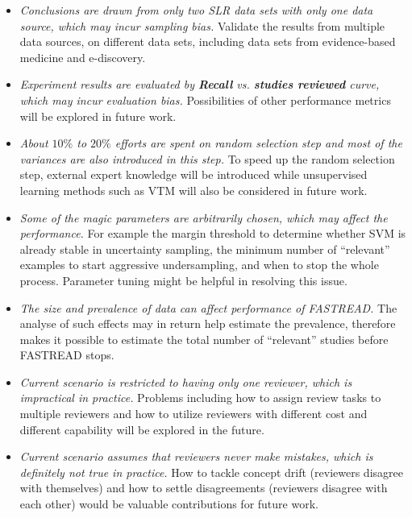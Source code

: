 \documentclass[final,twocolumn,5p]{elsarticle}
\theoremstyle{break}
\begin{document}
\begin{itemize}

\item
{\em Conclusions are drawn from only two SLR data sets with only one data source, which may incur sampling bias.} Validate the results from multiple data sources, on different data sets, including data sets from evidence-based medicine and e-discovery.

\item
{\em Experiment results are evaluated by \textbf{Recall} vs. \textbf{studies reviewed} curve, which may incur evaluation bias.} Possibilities of other performance metrics will be explored in future work.

\item
{\em About $10\%$ to $20\%$ efforts are spent on random selection step and most of the variances are also introduced in this step.} To speed up the random selection step, external expert knowledge will be introduced while unsupervised learning methods such as VTM will also be considered in future work. 

\item
{\em Some of the magic parameters are arbitrarily chosen, which may affect the performance.} For example the margin threshold to determine whether SVM is already stable in uncertainty sampling, the minimum number of ``relevant'' examples to start aggressive undersampling, and when to stop the whole process. Parameter tuning might be helpful in resolving this issue.

\item
{\em The size and prevalence of data can affect performance of FASTREAD.} The analyse of such effects may in return help estimate the prevalence, therefore makes it possible to estimate the total number of ``relevant'' studies before FASTREAD stops.

\item
{\em Current scenario is restricted to having only one reviewer, which is impractical in practice.} Problems including how to assign review tasks to multiple reviewers and how to utilize reviewers with different cost and different capability will be explored in the future.

\item
{\em Current scenario assumes that reviewers never make mistakes, which is definitely not true in practice.} How to tackle concept drift (reviewers disagree with themselves) and how to settle disagreements (reviewers disagree with each other) would be valuable contributions for future work.


\end{itemize}
\end{document}
